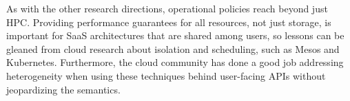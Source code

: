 \documentclass{sig-alternate}
\begin{document}
As with the other research directions, operational policies reach beyond just
HPC. Providing performance guarantees for all resources, not just storage, is
important for SaaS architectures that are shared among users, so lessons can be
gleaned from cloud research about isolation and scheduling, such as Mesos and
Kubernetes. Furthermore, the cloud community has done a good job addressing
heterogeneity when using these techniques behind user-facing APIs without
jeopardizing the semantics.

%

\end{document}
